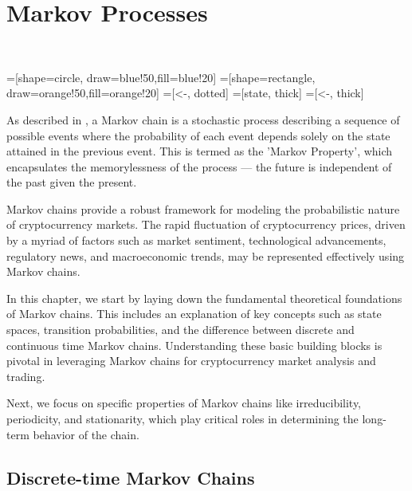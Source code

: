 \chapter{Markov Processes}~\label{chap:markov_processes}

\ifpdf%
    \graphicspath{{Chapter1/Figs/Raster/}{Chapter1/Figs/PDF/}{Chapter1/Figs/}}
\else
    \graphicspath{{Chapter1/Figs/Vector/}{Chapter1/Figs/}}
\fi

=[shape=circle, draw=blue!50,fill=blue!20]
=[shape=rectangle, draw=orange!50,fill=orange!20]
=[<-, dotted]
=[state, thick]
=[<-, thick]

As described in \citep{Ross2014}, a Markov chain is a stochastic process describing a sequence of possible events where the probability of each event depends solely on the state attained in the previous event. This is termed as the 'Markov Property', which encapsulates the memorylessness of the process — the future is independent of the past given the present.

Markov chains provide a robust framework for modeling the probabilistic nature of cryptocurrency markets. The rapid fluctuation of cryptocurrency prices, driven by a myriad of factors such as market sentiment, technological advancements, regulatory news, and macroeconomic trends, may be represented effectively using Markov chains.~\citep{Zhang2023}

In this chapter, we start by laying down the fundamental theoretical foundations of Markov chains. This includes an explanation of key concepts such as state spaces, transition probabilities, and the difference between discrete and continuous time Markov chains. Understanding these basic building blocks is pivotal in leveraging Markov chains for cryptocurrency market analysis and trading.

Next, we focus on specific properties of Markov chains like irreducibility, periodicity, and stationarity, which play critical roles in determining the long-term behavior of the chain.

\section{Discrete-time Markov Chains}~\label{sec:dtmc}

